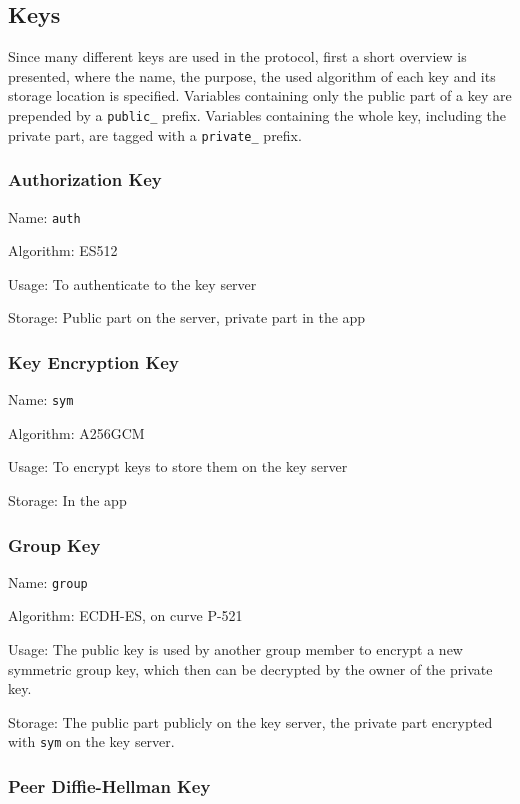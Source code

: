 \documentclass[a4paper, oneside]{discothesis}
\begin{document}
\subsection{Keys}

\label{sec:keys}

Since many different keys are used in the protocol, first a short overview is presented, where the name, the purpose, the used algorithm of each key and its storage location is specified. Variables containing only the public part of a key are prepended by a \texttt{public\_} prefix. Variables containing the whole key, including the private part, are tagged with a \texttt{private\_} prefix.

\subsubsection{Authorization Key}

Name: \texttt{auth}

\noindent
Algorithm: ES512

\noindent
Usage: To authenticate to the key server

\noindent
Storage: Public part on the server, private part in the app

\subsubsection{Key Encryption Key}

Name: \texttt{sym}

\noindent
Algorithm: A256GCM

\noindent
Usage: To encrypt keys to store them on the key server

\noindent
Storage: In the app

\subsubsection{Group Key}

Name: \texttt{group}

\noindent
Algorithm: ECDH-ES, on curve P-521

\noindent
Usage: The public key is used by another group member to encrypt a new symmetric group key, which then can be decrypted by the owner of the private key.

\noindent
Storage: The public part publicly on the key server, the private part encrypted with \texttt{sym} on the key server.

\subsubsection{Peer Diffie-Hellman Key}
\end{document}
